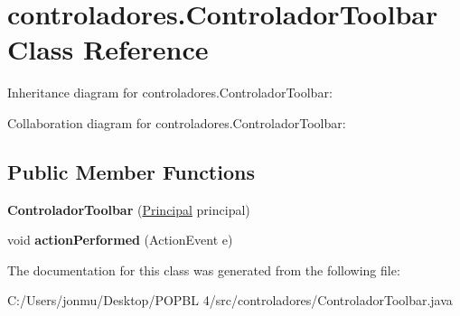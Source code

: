 \hypertarget{classcontroladores_1_1_controlador_toolbar}{}\section{controladores.\+Controlador\+Toolbar Class Reference}
\label{classcontroladores_1_1_controlador_toolbar}


Inheritance diagram for controladores.\+Controlador\+Toolbar\+:


Collaboration diagram for controladores.\+Controlador\+Toolbar\+:
\subsection*{Public Member Functions}
\begin{DoxyCompactItemize}
\item 
\mbox{\label{classcontroladores_1_1_controlador_toolbar_a7186864bd3fd61279fc13c4566d86cc3}} 
{\bfseries Controlador\+Toolbar} (\mbox{\hyperlink{classvistas_1_1_principal}{Principal}} principal)
\item 
\mbox{\label{classcontroladores_1_1_controlador_toolbar_a21d7012349c1f101be2d87495da85fa6}} 
void {\bfseries action\+Performed} (Action\+Event e)
\end{DoxyCompactItemize}


The documentation for this class was generated from the following file\+:\begin{DoxyCompactItemize}
\item 
C\+:/\+Users/jonmu/\+Desktop/\+P\+O\+P\+B\+L 4/src/controladores/Controlador\+Toolbar.\+java\end{DoxyCompactItemize}
